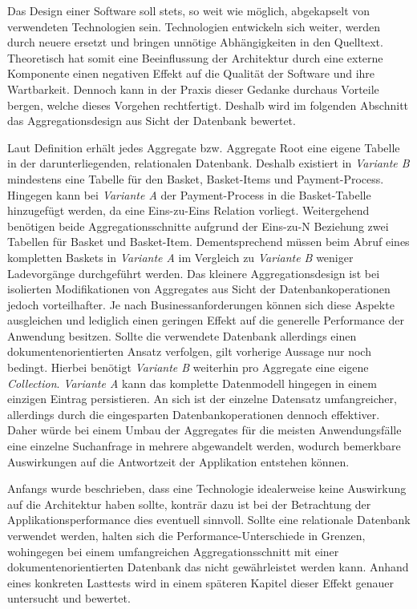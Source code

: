 Das Design einer Software soll stets, so weit wie möglich, abgekapselt von verwendeten Technologien sein. Technologien entwickeln sich weiter, werden durch neuere ersetzt und bringen unnötige Abhängigkeiten in den Quelltext. Theoretisch hat somit eine Beeinflussung der Architektur durch eine externe Komponente einen negativen Effekt auf die Qualität der Software und ihre Wartbarkeit. Dennoch kann in der Praxis dieser Gedanke durchaus Vorteile bergen, welche dieses Vorgehen rechtfertigt. Deshalb wird im folgenden Abschnitt das Aggregationsdesign aus Sicht der Datenbank bewertet.

Laut Definition erhält jedes Aggregate bzw. Aggregate Root eine eigene Tabelle in der darunterliegenden, relationalen Datenbank. Deshalb existiert in \emph{Variante B} mindestens eine Tabelle für den Basket, Basket-Items und Payment-Process. Hingegen kann bei \emph{Variante A} der Payment-Process in die Basket-Tabelle hinzugefügt werden, da eine Eins-zu-Eins Relation vorliegt. Weitergehend benötigen beide Aggregationsschnitte aufgrund der Eins-zu-N Beziehung zwei Tabellen für Basket und Basket-Item. Dementsprechend müssen beim Abruf eines kompletten Baskets in \emph{Variante A} im Vergleich zu \emph{Variante B} weniger Ladevorgänge durchgeführt werden. Das kleinere Aggregationsdesign ist bei isolierten Modifikationen von Aggregates aus Sicht der Datenbankoperationen jedoch vorteilhafter. Je nach Businessanforderungen können sich diese Aspekte ausgleichen und lediglich einen geringen Effekt auf die generelle Performance der Anwendung besitzen. Sollte die verwendete Datenbank allerdings einen dokumentenorientierten Ansatz verfolgen, gilt vorherige Aussage nur noch bedingt. Hierbei benötigt \emph{Variante B} weiterhin pro Aggregate eine eigene \emph{\Gls{Collection}}. \emph{Variante A} kann das komplette Datenmodell hingegen in einem einzigen Eintrag persistieren. An sich ist der einzelne Datensatz umfangreicher, allerdings durch die eingesparten Datenbankoperationen dennoch effektiver. Daher würde bei einem Umbau der Aggregates für die meisten Anwendungsfälle eine einzelne Suchanfrage in mehrere abgewandelt werden, wodurch bemerkbare Auswirkungen auf die Antwortzeit der Applikation entstehen können. 

Anfangs wurde beschrieben, dass eine Technologie idealerweise keine Auswirkung auf die Architektur haben sollte, konträr dazu ist bei der Betrachtung der Applikationsperformance dies eventuell sinnvoll. Sollte eine relationale Datenbank verwendet werden, halten sich die Performance-Unterschiede in Grenzen, wohingegen bei einem umfangreichen Aggregationsschnitt mit einer dokumentenorientierten Datenbank das nicht gewährleistet werden kann. Anhand eines konkreten Lasttests wird in einem späteren Kapitel dieser Effekt genauer untersucht und bewertet.

